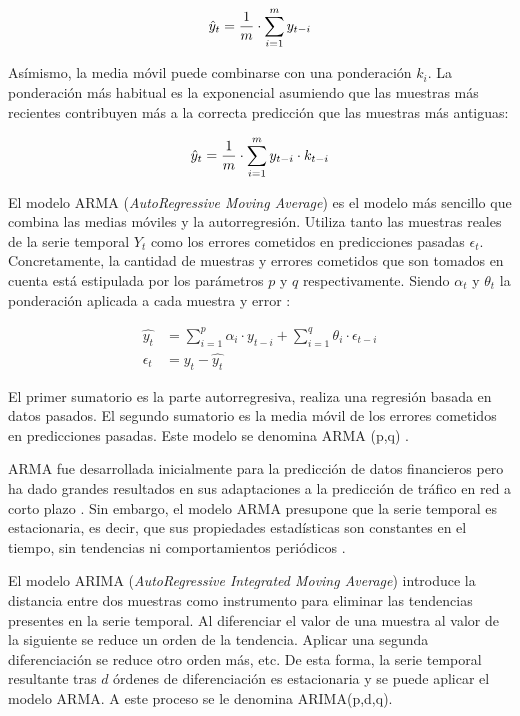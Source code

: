 \begin{equation}
	\centering
	\hat{y}_{t} = \frac{1}{m} \cdot \sum_{i=1}^{m} y_{t-i}
	\label{eq:ma}
\end{equation}

Asímismo, la media móvil puede combinarse con una ponderación $k_i$. La ponderación más habitual es la exponencial asumiendo que las muestras más recientes contribuyen más a la correcta predicción que las muestras más antiguas:

\begin{equation}
	\centering
	\hat{y}_{t} = \frac{1}{m} \cdot \sum_{i=1}^{m} y_{t-i} \cdot k_{t-i}
\end{equation}

El modelo ARMA (\textit{AutoRegressive Moving Average}) \cite{arma} es el modelo más sencillo que combina las medias móviles y la autorregresión. Utiliza tanto las muestras reales de la serie temporal $Y_t$  como los errores cometidos en predicciones pasadas $\epsilon_t$. Concretamente, la cantidad de muestras y errores cometidos que son tomados en cuenta está estipulada por los parámetros $p$ y $q$ respectivamente. Siendo $\alpha_t$ y $\theta_t$ la ponderación aplicada a cada muestra y error \cite{machinelearningbook,arma, arma3}:

\begin{align}
	\hat{y_t} &= \sum_{i=1}^{p} \alpha_i \cdot y_{t-i}  +  \sum_{i=1}^{q} \theta_i \cdot \epsilon_{t-i}\\
	\epsilon_t &= y_t - \hat{y_t}
\end{align}

El primer sumatorio es la parte autorregresiva, realiza una regresión basada en datos pasados. El segundo sumatorio es la media móvil de los errores cometidos en predicciones pasadas. Este modelo se denomina ARMA (p,q) \cite{arma1,arma2,arma3}.

ARMA fue desarrollada inicialmente para la predicción de datos financieros \cite{arma1} pero ha dado grandes resultados en sus adaptaciones a la predicción de tráfico en red a corto plazo \cite{arma2,arima1}. Sin embargo, el modelo ARMA presupone que la serie temporal es estacionaria, es decir, que sus propiedades estadísticas son constantes en el tiempo, sin tendencias ni comportamientos periódicos \cite{machinelearningbook}.

El modelo ARIMA (\textit{AutoRegressive Integrated Moving Average}) \cite{arima2} introduce la distancia entre dos muestras como instrumento para eliminar las tendencias presentes en la serie temporal. Al diferenciar el valor de una muestra al valor de la siguiente se reduce un orden de la tendencia. Aplicar una segunda diferenciación se reduce otro orden más, etc. De esta forma, la serie temporal resultante tras $d$ órdenes de diferenciación es estacionaria y se puede aplicar el modelo ARMA. A este proceso se le denomina ARIMA(p,d,q).

